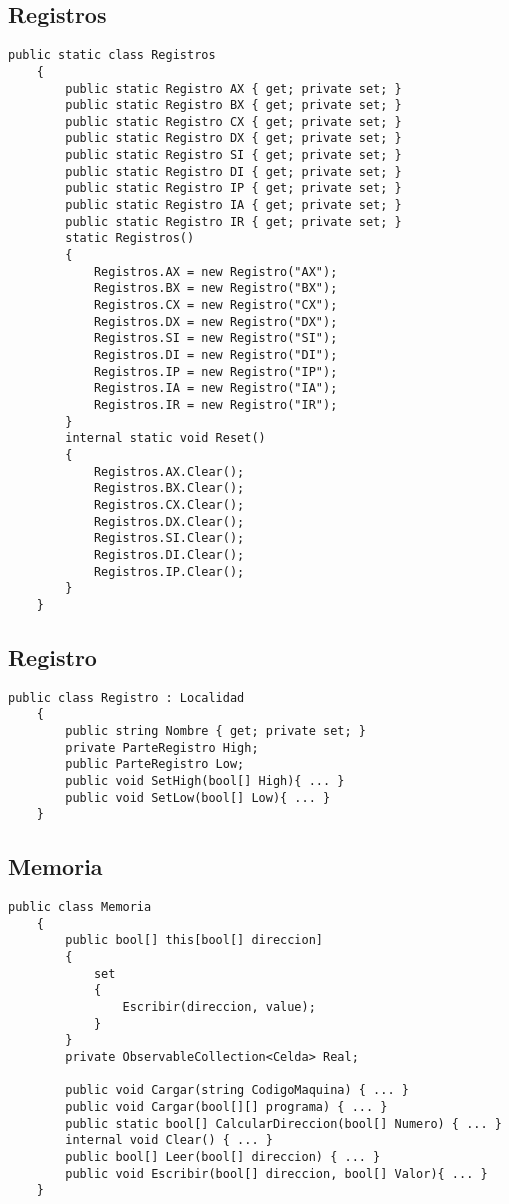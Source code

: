 \documentclass{scrartcl}
\begin{document}
\subsection{Registros}
\begin{lstlisting}[language={[Sharp]C}, title={Registros}]
    public static class Registros
    {
        public static Registro AX { get; private set; }
        public static Registro BX { get; private set; }
        public static Registro CX { get; private set; }
        public static Registro DX { get; private set; }
        public static Registro SI { get; private set; }
        public static Registro DI { get; private set; }
        public static Registro IP { get; private set; }
        public static Registro IA { get; private set; }
        public static Registro IR { get; private set; }
        static Registros()
        {
            Registros.AX = new Registro("AX");
            Registros.BX = new Registro("BX");
            Registros.CX = new Registro("CX");
            Registros.DX = new Registro("DX");
            Registros.SI = new Registro("SI");
            Registros.DI = new Registro("DI");
            Registros.IP = new Registro("IP");
            Registros.IA = new Registro("IA");
            Registros.IR = new Registro("IR");
        }
        internal static void Reset()
        {
            Registros.AX.Clear();
            Registros.BX.Clear();
            Registros.CX.Clear();
            Registros.DX.Clear();
            Registros.SI.Clear();
            Registros.DI.Clear();
            Registros.IP.Clear();
        }
    }
\end{lstlisting}

\subsection{Registro}
\begin{lstlisting}[language={[Sharp]C}, title={Registro}]
    public class Registro : Localidad
    {
        public string Nombre { get; private set; }
        private ParteRegistro High;
        public ParteRegistro Low;
        public void SetHigh(bool[] High){ ... }
        public void SetLow(bool[] Low){ ... }
    }
\end{lstlisting}
\newpage

\subsection{Memoria}
\begin{lstlisting}[language={[Sharp]C}, title={Memoria}]
    public class Memoria 
    {
        public bool[] this[bool[] direccion]
        {
            set
            {
                Escribir(direccion, value);
            }
        }
        private ObservableCollection<Celda> Real;

        public void Cargar(string CodigoMaquina) { ... }
        public void Cargar(bool[][] programa) { ... }
        public static bool[] CalcularDireccion(bool[] Numero) { ... }
        internal void Clear() { ... }
        public bool[] Leer(bool[] direccion) { ... }
        public void Escribir(bool[] direccion, bool[] Valor){ ... }
    }
\end{lstlisting}
\end{document}
